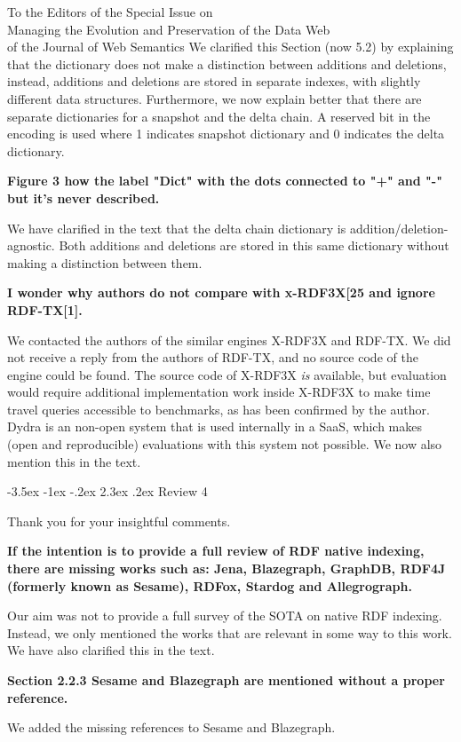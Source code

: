 \documentclass{letter}
\makeatletter
\newcounter{section}
\newcommand\section{\@startsection {section}{1}{\z@}%
                                   {-3.5ex \@plus -1ex \@minus -.2ex}%
                                   {2.3ex \@plus.2ex}%
                                   {\normalfont\Large\bfseries}}
\makeatother
\begin{document}
\begin{letter}{To the Editors of the Special Issue on\\Managing the Evolution and Preservation of the Data Web\\of the Journal of Web Semantics}
We clarified this Section (now 5.2) by explaining that the dictionary does not make a distinction between additions and deletions,
instead, additions and deletions are stored in separate indexes, with slightly different data structures.
Furthermore, we now explain better that there are separate dictionaries for a snapshot and the delta chain.
A reserved bit in the encoding is used where 1 indicates snapshot dictionary and 0 indicates the delta dictionary.

\textbf{Figure 3 how the label "Dict" with the dots connected to "+" and "-" but it's never described.}

We have clarified in the text that the delta chain dictionary is addition/deletion-agnostic.
Both additions and deletions are stored in this same dictionary without making a distinction between them.

\textbf{I wonder why authors do not compare with x-RDF3X[25 and ignore RDF-TX[1].}

We contacted the authors of the similar engines X-RDF3X and RDF-TX.
We did not receive a reply from the authors of RDF-TX, and no source code of the engine could be found.
The source code of X-RDF3X \emph{is} available, but evaluation would require additional implementation work inside X-RDF3X
to make time travel queries accessible to benchmarks, as has been confirmed by the author.
Dydra is an non-open system that is used internally in a SaaS, which makes (open and reproducible) evaluations with this system not possible.
We now also mention this in the text.

\pagebreak
\section{Review 4}

Thank you for your insightful comments.

\textbf{If the intention is to provide a full review of RDF native indexing, there are missing works such as: Jena, Blazegraph, GraphDB, RDF4J (formerly known as Sesame), RDFox, Stardog and Allegrograph.}

Our aim was not to provide a full survey of the SOTA on native RDF indexing.
Instead, we only mentioned the works that are relevant in some way to this work.
We have also clarified this in the text.

\textbf{Section 2.2.3 Sesame and Blazegraph are mentioned without a proper reference. }

We added the missing references to Sesame and Blazegraph.


\end{letter}
\end{document}
